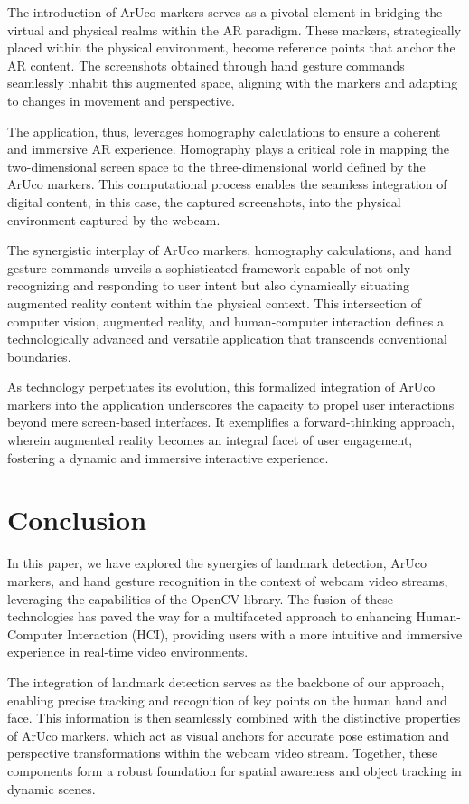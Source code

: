 \documentclass[journal]{IEEEtran}
\begin{document}
The introduction of ArUco markers serves as a pivotal element in bridging the virtual and physical realms within the AR paradigm. 
These markers, strategically placed within the physical environment, become reference points that anchor the AR content. 
The screenshots obtained through hand gesture commands seamlessly inhabit this augmented space, aligning with the markers and adapting 
to changes in movement and perspective.

The application, thus, leverages homography calculations to ensure a coherent and immersive AR experience. Homography plays a 
critical role in mapping the two-dimensional screen space to the three-dimensional world defined by the ArUco markers. This computational
 process enables the seamless integration of digital content, in this case, the captured screenshots, into the physical environment 
 captured by the webcam.

The synergistic interplay of ArUco markers, homography calculations, and hand gesture commands unveils a sophisticated framework 
capable of not only recognizing and responding to user intent but also dynamically situating augmented reality content within the 
physical context. This intersection of computer vision, augmented reality, and human-computer interaction defines a technologically 
advanced and versatile application that transcends conventional boundaries.

As technology perpetuates its evolution, this formalized integration of ArUco markers into the application underscores the capacity 
to propel user interactions beyond mere screen-based interfaces. It exemplifies a forward-thinking approach, wherein augmented reality 
becomes an integral facet of user engagement, fostering a dynamic and immersive interactive experience.



\section{Conclusion}
In this paper, we have explored the synergies of landmark detection, ArUco markers, and hand gesture recognition in the context 
of webcam video streams, leveraging the capabilities of the OpenCV library. The fusion of these technologies has paved the way for 
a multifaceted approach to enhancing Human-Computer Interaction (HCI), providing users with a more intuitive and immersive 
experience in real-time video environments.

The integration of landmark detection serves as the backbone of our approach, enabling precise tracking and recognition of 
key points on the human hand and face. This information is then seamlessly combined with the distinctive properties of ArUco markers, 
which act as visual anchors for accurate pose estimation and perspective transformations within the webcam video stream. Together, 
these components form a robust foundation for spatial awareness and object tracking in dynamic scenes.
\end{document}
